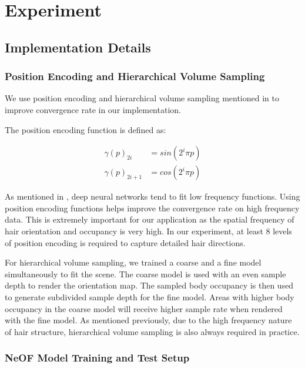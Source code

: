 \documentclass{article}
\begin{document}
\section{Experiment}


\subsection{Implementation Details}

\subsubsection{Position Encoding and Hierarchical Volume Sampling}

We use position encoding and hierarchical volume sampling mentioned in \cite{mildenhall_nerf_2020} to improve convergence rate in our implementation.

The position encoding function is defined as:

\begin{align}
    \gamma(p)_{2i} &= sin(2^{i} \pi p) \\
    \gamma(p)_{2i + 1} &= cos(2^{i} \pi p)
\end{align}

As mentioned in \cite{mildenhall_nerf_2020}, deep neural networks tend to fit low frequency functions. Using position encoding functions helps improve the convergence rate on high frequency data. This is extremely important for our application as the spatial frequency of hair orientation and occupancy is very high. In our experiment, at least 8 levels of position encoding is required to capture detailed hair directions.

For hierarchical volume sampling, we trained a coarse and a fine model simultaneously to fit the scene. The coarse model is used with an even sample depth to render the orientation map. The sampled body occupancy is then used to generate subdivided sample depth for the fine model. Areas with higher body occupancy in the coarse model will receive higher sample rate when rendered with the fine model. As mentioned previously, due to the high frequency nature of hair structure, hierarchical volume sampling is also always required in practice.

\subsubsection{NeOF Model Training and Test Setup}
\end{document}
